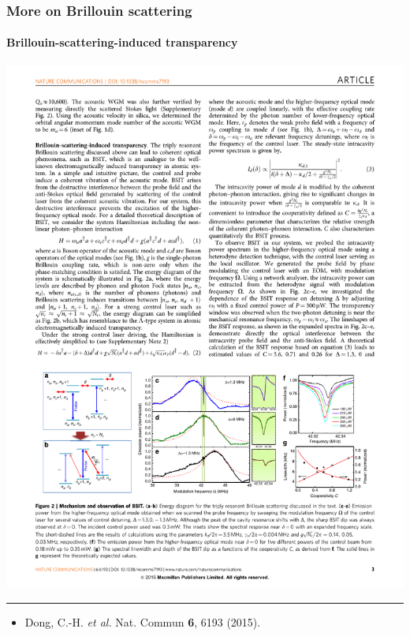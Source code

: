 \documentclass{beamer}
\def\etal{\emph{et al. }}
\begin{document}
\begin{frame}
\frametitle{More on Brillouin scattering}
\framesubtitle{Brillouin-scattering-induced transparency}
\vspace{3em}

\begin{center}
\includegraphics[width=1.0\columnwidth]{f8.pdf}
\end{center}

\vspace{3em}
\noindent\rule{0.1\textwidth}{0.5pt}

\begin{itemize}
\item \tiny{Dong, C.-H. \etal Nat. Commun \textbf{6}, 6193 (2015).

}
\end{itemize}
\end{frame}


%
%
%
%
%
%
\end{document}

